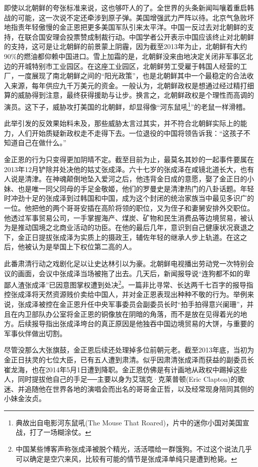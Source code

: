 即使以北朝鲜的夸张标准来说，这也够吓人的了。全世界的头条新闻叫嚷着重启韩战的可能，这一次说不定还牵涉到原子弹。美国增强武力严阵以待。北京气急败坏地指责年轻傲慢的金正恩把更多美国军队引来太平洋。中国一反过去对北朝鲜的支持，在联合国安理会投票赞成制裁行动。中国学者公开表示中国应该终止对北朝鲜的支持，这可是让北朝鲜的前景蒙上阴霾，因为截至2013年为止，北朝鲜有大约90\%的燃油都仰赖中国进口。雪上加霜的是，北朝鲜没来由地决定关闭非军事区北边的开城特别市工业园区。在这座工业园区，北朝鲜劳工受雇于韩国人经营的工厂，一度展现了南北朝鲜之间的“阳光政策”，也是北朝鲜其中一个最稳定的合法收入来源，每年供应九千万美元的资金。一般认为，北朝鲜政权是想通过经过精打细算的威胁得到注意，最终获得援助与让步。换言之，北朝鲜政权是个理性而高调的演员。这下子，威胁攻打美国的北朝鲜，却显得像“河东鼠吼\footnote{典故出自电影河东鼠吼(The Mouse That Roared)，片中的迷你小国对美国宣战，打了一场糊涂仗。}”的老鼠一样滑稽。

此举引发的反效果始料未及，那些威胁太言过其实，并不符合北朝鲜实际上的能力，人们开始质疑新政权走不走得下去。一位退役的中国将领告诉我：“这孩子不知道自己在做什么。”

金正恩的行为只变得更加阴晴不定。截至目前为止，最莫名其妙的一起事件要属在2013年12月铲除并处决他的姑丈张成泽。六十七岁的张成泽在咸镜北道长大，也有人说是清津。在神魂颠倒地坠入爱河之后，他违背金日成的意愿，娶了金正日的小妹、也是唯一同父同母的手足金敬姬，他们的罗曼史是清津热门的八卦话题。年轻时冲劲十足的张成泽到过韩国和中国，成为这个封闭的统治家族当中最见多识广的一位。他把他的两个哥哥安插在高阶将领的职位，又为侄子和妻舅安排外交职位。他透过军事贸易公司，一手掌握海产、煤炭、矿物和民生消费品等边境贸易，被认为是推动国境之北商业活动的功臣。在他的最后几年，意识到自己健康状况衰退之下，金正日提拔张成泽为实质上的摄政王，辅佐年轻的继承人步上轨道。在这之后，他被认为是举国上下权位第二高的人。

此番肃清行动之戏剧化足以让史达林引以为豪。北朝鲜电视播出劳动党一次特别会议的画面，会议中张成泽当场被拖了出去。几天后，新闻报导说“连狗都不如的卑鄙人渣张成泽”已因意图掌权遭到处决\footnote{中国某些博客声称张成泽被脱个精光，活活喂给一群饿狗。不过这个说法几乎可以确定是空穴来风，比较有可能的情节是张成泽单纯只是遭到枪毙。}。一篇非比寻常、长达两千七百字的报导指控张成泽将天然资源贱价卖给中国人，并对金正恩表现出种种不敬的行为。举例来说，张成泽被控在金正恩升任中央军事委员会副委员长时“拍手拍得意兴阑珊”，并且在内卫部队办公室将金正恩的铜像放在阴暗的角落，而不是放在见得着光的地方。后续报导指出张成泽垮台的真正原因是他独吞中国边境贸易的大饼，与重要的军事伙伴做出切割。

尽管没那么大张旗鼓，金正恩后续还处理掉多位前朝元老。截至2013年底，当初为金正日扶灵的七位大臣，已有五人遭到肃清。似乎因肃清张成泽而获益的副委员长崔龙海，也在2014年5月1日遭到降职。金正恩仿佛是有计画地从政权中踢掉这些人，同时提拔他自己的手足──主要以身为艾瑞克·克莱普顿(Eric Clapton)的歌迷、并追随他在世界各地的演唱会而出名的哥哥金正哲，以及经常现身陪同其侧的小妹金汝贞。

